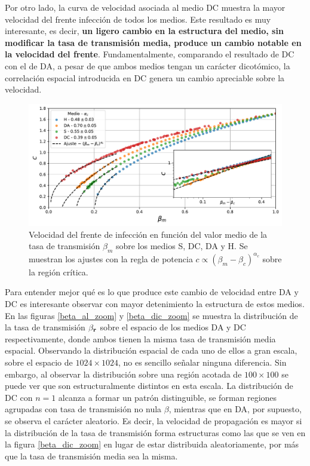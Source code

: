 Por otro lado, la curva de velocidad asociada al medio DC muestra la mayor velocidad del frente infección de todos los medios. Este resultado es muy interesante, es decir, \textbf{un ligero cambio en la estructura del medio, sin modificar la tasa de transmisión media, produce un cambio notable en la velocidad del frente}. Fundamentalmente, comparando el resultado de DC con el de DA, a pesar de que ambos medios tengan un carácter dicotómico, la correlación espacial
introducida en DC genera un cambio apreciable sobre la velocidad.

\begin{figure}[!b]
    \centering
    \includegraphics[width=\imsizeL]{c_all.pdf}
    \caption[Velocidad del frente de infección en función de $\beta_m$ para los medios H, S, DA y DC]{Velocidad del frente de infección en función del valor medio de la tasa de transmisión $\beta_m$ sobre los medios S, DC, DA y 
    H. Se muestran los ajustes con la regla de potencia $c\propto(\beta_m-\beta_c)^{\alpha_c}$ sobre la región crítica.}
    \label{fig:c_all}
\end{figure}

Para entender mejor qué es lo que produce este cambio de velocidad entre DA y DC es interesante observar con mayor detenimiento la estructura de estos medios. En las 
figuras \ref{beta_al_zoom} y \ref{beta_dic_zoom} se muestra la distribución de la tasa de transmisión $\beta_{\vb r}$ sobre el espacio de los medios DA y DC respectivamente, donde ambos tienen la misma tasa de transmisión media espacial. Observando la distribución espacial de cada uno de ellos 
a gran escala, sobre el espacio de $1024\times1024$, no es sencillo señalar ninguna diferencia. Sin embargo, al observar la distribución sobre una región acotada de 
$100\times100$ se puede ver que son estructuralmente distintos en esta escala. La distribución de DC con $n=1$ alcanza a formar un patrón  
distinguible, se forman regiones agrupadas con tasa de transmisión no nula $\beta$, mientras que en DA, por supuesto, se observa el carácter aleatorio. Es decir, la velocidad de propagación es mayor si la distribución de la tasa de transmisión forma estructuras como las que se ven en la figura 
\ref{beta_dic_zoom} en lugar de estar distribuida aleatoriamente, por más que la tasa de transmisión media sea la misma.

